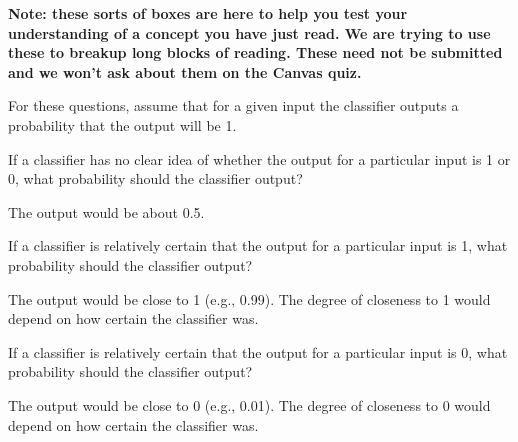 \documentclass[assignment03_Solutions]{subfiles}
\begin{document}
\begin{understandingcheck}
\textbf{Note: these sorts of boxes are here to help you test your understanding of a concept you have just read.  We are trying to use these to breakup long blocks of reading.  These need not be submitted and we won't ask about them on the Canvas quiz.}

For these questions, assume that for a given input the classifier outputs a probability that the output will be 1.
\bes
\item If a classifier has no clear idea of whether the output for a particular input is 1 or 0, what probability should the classifier output?
\begin{boxedsolution}
The output would be about 0.5.
\end{boxedsolution}
\item If a classifier is relatively certain that the output for a particular input is 1, what probability should the classifier output?
\begin{boxedsolution}
The output would be close to 1 (e.g., 0.99).  The degree of closeness to 1 would depend on how certain the classifier was.
\end{boxedsolution}
\item If a classifier is relatively certain that the output for a particular input is 0, what probability should the classifier output?
\begin{boxedsolution}
The output would be close to 0 (e.g., 0.01).  The degree of closeness to 0 would depend on how certain the classifier was.
\end{boxedsolution}
\ees

\end{understandingcheck}
\end{document}
